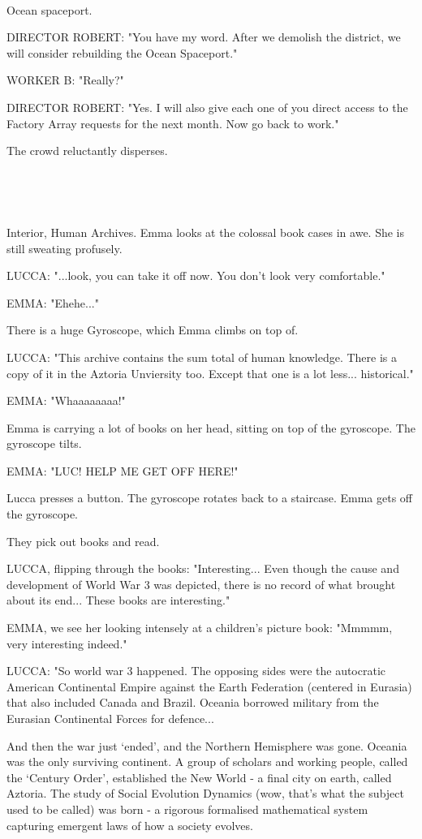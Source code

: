 \documentclass[11pt]{article}
\begin{document}
\ 

Ocean spaceport.

DIRECTOR ROBERT: "You have my word.
After we demolish the district, we will consider rebuilding the Ocean Spaceport."

WORKER B: "Really?"

DIRECTOR ROBERT: "Yes. 
I will also give each one of you direct access to the Factory Array requests for the next month. 
Now go back to work."

The crowd reluctantly disperses.

\ 

\ 

Interior, Human Archives.
Emma looks at the colossal book cases in awe.
She is still sweating profusely.

LUCCA: "...look, you can take it off now. 
You don't look very comfortable."

EMMA: "Ehehe..."

There is a huge Gyroscope, which Emma climbs on top of.

LUCCA: "This archive contains the sum total of human knowledge. 
There is a copy of it in the Aztoria Unviersity too.
Except that one is a lot less... historical."

EMMA: "Whaaaaaaaa!"

Emma is carrying a lot of books on her head, sitting on top of the gyroscope. The gyroscope tilts.

EMMA: "LUC! HELP ME GET OFF HERE!"

Lucca presses a button. The gyroscope rotates back to a staircase. 
Emma gets off the gyroscope.

They pick out books and read.

LUCCA, flipping through the books: "Interesting...
Even though the cause and development of World War 3 was depicted, there is no record of what brought about its end...
These books are interesting."

EMMA, we see her looking intensely at a children's picture book: "Mmmmm, very interesting indeed."

LUCCA: "So world war 3 happened. 
The opposing sides were the autocratic American Continental Empire against the Earth Federation (centered in Eurasia) that also included Canada and Brazil.
Oceania borrowed military from the Eurasian Continental Forces for defence...

And then the war just `ended', and the Northern Hemisphere was gone.
Oceania was the only surviving continent.
A group of scholars and working people, called the `Century Order', established the New World - a final city on earth, called Aztoria.
The study of Social Evolution Dynamics (wow, that's what the subject used to be called) was born - a rigorous formalised mathematical system capturing emergent laws of how a society evolves.
\end{document}
